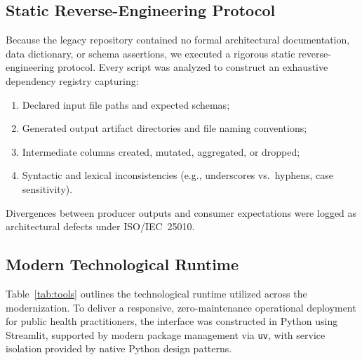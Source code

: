 \documentclass[conference]{IEEEtran}
\begin{document}
\subsection{Static Reverse-Engineering Protocol}

Because the legacy repository contained no formal architectural documentation, data dictionary, or schema assertions, we executed a rigorous static reverse-engineering protocol. Every script was analyzed to construct an exhaustive dependency registry capturing:
\begin{enumerate}
  \item Declared input file paths and expected schemas;
  \item Generated output artifact directories and file naming conventions;
  \item Intermediate columns created, mutated, aggregated, or dropped;
  \item Syntactic and lexical inconsistencies (e.g., underscores vs.\ hyphens, case sensitivity).
\end{enumerate}
Divergences between producer outputs and consumer expectations were logged as architectural defects under ISO/IEC~25010.

\subsection{Modern Technological Runtime}

Table~\ref{tab:tools} outlines the technological runtime utilized across the modernization. To deliver a responsive, zero-maintenance operational deployment for public health practitioners, the interface was constructed in Python using Streamlit, supported by modern package management via \texttt{uv}, with service isolation provided by native Python design patterns.
\end{document}
